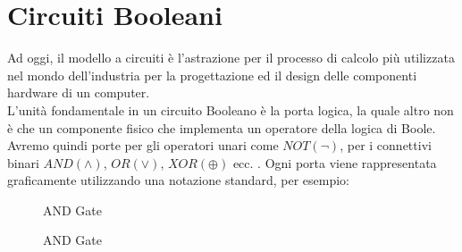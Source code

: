 \documentclass[12pt,a4paper,openright]{report}
\newcommand*\xor{\mathbin{\oplus}}
\begin{document}
\section{Circuiti Booleani}
Ad oggi, il modello a circuiti è l'astrazione per il processo di calcolo più utilizzata nel mondo dell'industria per la progettazione ed il
design delle componenti hardware di un computer.\\
L'unità fondamentale in un circuito Booleano è la porta logica, la quale altro non è che un componente fisico che implementa un operatore della logica di Boole. 
Avremo quindi porte per gli operatori unari come $NOT(\neg)$, per i connettivi binari $AND(\land)$, $OR(\lor)$, $XOR(\xor)$ ecc. . Ogni porta viene rappresentata graficamente 
utilizzando una notazione standard, per esempio: 
\vspace{10pt}
\begin{figure}[h]
    \centering
        \resizebox{.3\textwidth}{!} {%
                    
        }
        \caption{AND Gate}
    
\end{figure}
\begin{figure}[h]
    \centering
        \caption{AND Gate}
\end{figure}
\end{document}
